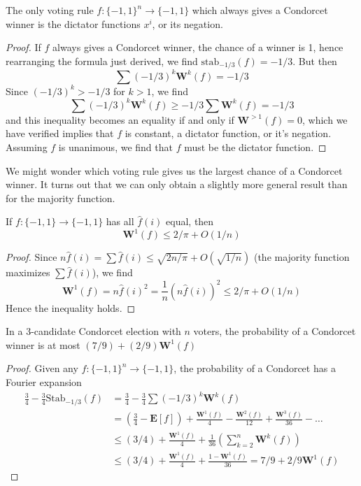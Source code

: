 \begin{theorem}[Kalai]
    The only voting rule $f: \{ -1, 1 \}^n \to \{ -1, 1 \}$ which always gives a Condorcet winner is the dictator functions $x^i$, or its negation.
\end{theorem}
\begin{proof}
    If $f$ always gives a Condorcet winner, the chance of a winner is 1, hence rearranging the formula just derived, we find $\text{stab}_{-1/3}(f) = -1/3$. But then
    \[ \sum (-1/3)^k \mathbf{W}^k(f) = -1/3 \]
    Since $(-1/3)^k > -1/3$ for $k > 1$, we find
    \[ \sum (-1/3)^k \mathbf{W}^k(f) \geq -1/3 \sum \mathbf{W}^k(f) = -1/3 \]
    and this inequality becomes an equality if and only if $\mathbf{W}^{> 1}(f) = 0$, which we have verified implies that $f$ is constant, a dictator function, or it's negation. Assuming $f$ is unanimous, we find that $f$ must be the dictator function.
\end{proof}

We might wonder which voting rule gives us the largest chance of a Condorcet winner. It turns out that we can only obtain a slightly more general result than for the majority function.

\begin{lemma}
    If $f: \{ -1, 1 \} \to \{ -1, 1 \}$ has all $\widehat{f}(i)$ equal, then
    \[ \mathbf{W}^1(f) \leq 2/\pi + O(1/n) \]
\end{lemma}
\begin{proof}
    Since $n \widehat{f}(i) = \sum \widehat{f}(i) \leq \sqrt{2n/\pi} + O(\sqrt{1/n})$ (the majority function maximizes $\sum \widehat{f}(i)$), we find
    \[ \mathbf{W}^1(f) = n \widehat{f}(i)^2 = \frac{1}{n} (n \widehat{f}(i))^2 \leq 2/\pi + O(1/n) \]
    Hence the inequality holds.
\end{proof}

\begin{theorem}
    In a 3-candidate Condorcet election with $n$ voters, the probability of a Condorcet winner is at most $(7/9) + (2/9) \mathbf{W}^1(f)$
\end{theorem}
\begin{proof}
    Given any $f: \{ -1, 1 \}^n \to \{ -1, 1 \}$, the probability of a Condorcet has a Fourier expansion
    \begin{align*}
        \frac{3}{4} - \frac{3}{4} \text{Stab}_{-1/3}(f) &= \frac{3}{4} - \frac{3}{4} \sum (-1/3)^k \mathbf{W}^k(f)\\
        &= \left( \frac{3}{4} - \mathbf{E}[f] \right) + \frac{\mathbf{W}^1(f)}{4} - \frac{\mathbf{W}^2(f)}{12} + \frac{\mathbf{W}^3(f)}{36} - \dots\\
        &\leq (3/4) + \frac{\mathbf{W}^1(f)}{4} + \frac{1}{36} \left( \sum_{k = 2}^n \mathbf{W}^{k}(f) \right)\\
        &\leq (3/4) + \frac{\mathbf{W}^1(f)}{4} + \frac{1 - \mathbf{W}^1(f)}{36} = 7/9 + 2/9 \mathbf{W}^1(f)
    \end{align*}
\end{proof}

